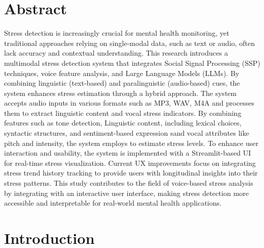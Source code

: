 \documentclass[Arial,12pt,openright,twoside]{book}
\begin{document}
\cleardoublepage


%

\tableofcontents
\listoftables
\listoffigures

\chapter*{Abstract}

Stress detection is increasingly crucial for mental health monitoring, yet traditional approaches relying on single-modal data, such as text or audio, often lack accuracy and contextual understanding. This research introduces a multimodal stress detection system that integrates Social Signal Processing (SSP) techniques, voice feature analysis, and Large Language Models (LLMs). By combining linguistic (text-based) and paralinguistic (audio-based) cues, the system enhances stress estimation through a hybrid approach. The system accepts audio inputs in various formats such as MP3, WAV, M4A and processes them to extract linguistic content and vocal stress indicators. By combining features such as tone detection, Linguistic content, including lexical choices, syntactic structures, and sentiment-based expression sand vocal attributes like pitch and intensity, the system employs to estimate stress levels. To enhance user interaction and usability, the system is implemented with a Streamlit-based UI for real-time stress visualization. Current UX improvements focus on integrating stress trend history tracking to provide users with longitudinal insights into their stress patterns. %
This study contributes to the field of voice-based stress analysis by integrating  with an interactive user interface, making stress detection more accessible and interpretable for real-world mental health applications.


\chapter{Introduction}
\clearpage  %
\end{document}
